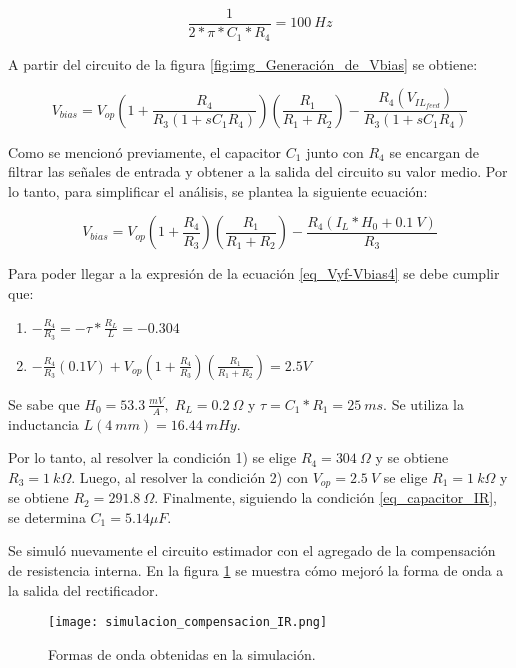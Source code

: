 \begin{equation} \label{eq_capacitor_IR}
	\frac{1}{2*\pi*C_1*R_4}=100\:Hz
\end{equation}



A partir del circuito de la figura \ref{fig:img_Generación_de_Vbias} se obtiene:

\begin{equation} \label{eq_Vyf-Vbias3}
	V_{bias} =V_{op}(1+\frac{ R_4}{R_3(1+sC_1R_4)})(\frac{R_1}{R_1+R_2})-\frac{R_4(V_{IL_{feed}})}{R_3(1+s C_1R_4)}
\end{equation}

Como se mencionó previamente, el capacitor $C_1$ junto con $R_4$ se encargan de filtrar las señales de entrada y obtener a la salida del circuito su valor medio. Por lo tanto, para simplificar el análisis, se plantea la siguiente ecuación:

\begin{equation} 
	V_{bias} =V_{op}(1+\frac{ R_4}{R_3})(\frac{R_1}{R_1+R_2})-\frac{R_4(I_L*H_0+0.1\:V)}{R_3}
\end{equation}


Para poder llegar a la expresión de la ecuación \ref{eq_Vyf-Vbias4} se debe cumplir que:

\begin{enumerate}
	\item  $-\frac{R_4}{R_3}=- \tau *\frac{R_L}{L}= -0.304$  
	
	\item  $-\frac{R_4}{R_3}(0.1V)+V_{op}(1+\frac{ R_4}{R_3})(\frac{R_1}{R_1+R_2}) = 2.5V$     
\end{enumerate}

Se sabe que $H_0 = 53.3\:\frac{mV}{A},\; R_L = 0.2\:\Omega$ y $\tau=C_1*R_1=25 \:ms$. Se utiliza la inductancia $L(4\:mm) = 16.44\:mHy$.

Por lo tanto, al resolver la condición 1) se elige $R_4 = 304\: \Omega$ y se obtiene $R_3=1\:k\Omega$. Luego, al resolver la condición 2) con $V_{op}=2.5\:V$ se elige $R_1=1\:k\Omega$ y se obtiene $R_{2}=291.8\:\Omega$. Finalmente, siguiendo la condición \ref{eq_capacitor_IR}, se determina $C_1=5.14\mu F$.

Se simuló nuevamente el circuito estimador con el agregado de la compensación de resistencia interna. En la figura \ref{fig:img_Formas_de_onda_obtenidas_en_la_simulación} se muestra cómo mejoró la forma de onda a la salida del rectificador.

\begin{figure}[H]
	\centering
	\texttt{[image: simulacion\_compensacion\_IR.png]}
	\caption{Formas de onda obtenidas en la simulación.}
	\label{fig:img_Formas_de_onda_obtenidas_en_la_simulación}
\end{figure}


